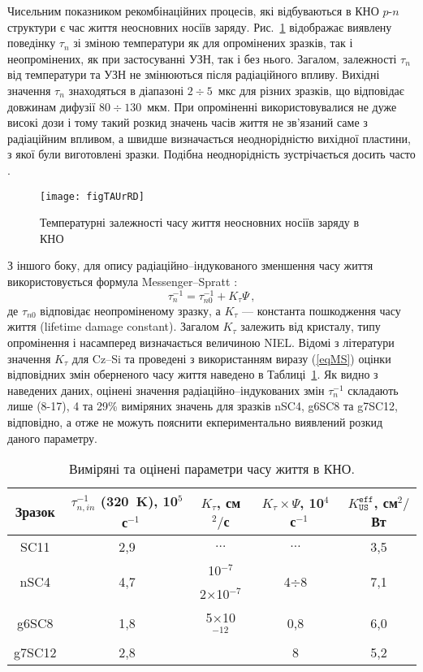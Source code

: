 Чисельним показником рекомбінаційних процесів, які відбуваються в КНО $p$-$n$ структури є
час життя неосновних носіїв заряду.
Рис.~\ref{figTAUrRD} відображає виявлену поведінку $\tau_n$ зі зміною температури як для опромінених зразків,
так і неопромінених, як при застосуванні УЗН, так і без нього.
Загалом, залежності $\tau_n$ від температури та УЗН не змінюються після радіаційного впливу.
Вихідні значення $\tau_n$ знаходяться в діапазоні $2\div5$~мкс для різних зразків,
що відповідає довжинам дифузії $80\div130$~мкм.
При опроміненні використовувалися не дуже високі дози і тому
такий розкид значень часів життя не зв'язаний саме з радіаційним впливом,
а швидше визначається неоднорідністю вихідної пластини, з якої були виготовлені зразки.
Подібна неоднорідність зустрічається досить часто \cite{Oxide:Chen,Oxide_Schon}.


\begin{figure}
\center
\texttt{[image: figTAUrRD]}
\caption{\label{figTAUrRD}
Температурні залежності часу життя неосновних носіїв заряду в КНО
\FigCaptionSSCRD
}%
\end{figure}

З іншого боку, для опису радіаційно--індукованого зменшення часу життя використовується формула Messenger--Spratt \cite{Markvart}:
\begin{equation}
\label{eqMS}
\tau_n^{-1}=\tau_{n0}^{-1}+K_\tau\Psi\,,
\end{equation}
де
$\tau_{n0}$ відповідає неопроміненому зразку, а
$K_\tau$ --- константа пошкодження часу життя (lifetime damage constant).
Загалом $K_\tau$ залежить від кристалу, типу опромінення і насамперед визначається величиною NIEL.
Відомі з літератури значення $K_\tau$ для Cz--Si та проведені з використанням виразу (\ref{eqMS}) оцінки відповідних
змін оберненого часу життя наведено в Таблиці~\ref{tabTAUn}.
Як видно з наведених даних, оцінені значення радіаційно--індукованих змін $\tau_n^{-1}$ складають лише
(8-17), 4 та 29\% виміряних значень для зразків nSC4, g6SC8 та g7SC12, відповідно, а отже не можуть
пояснити екпериментально виявлений розкид даного параметру.

\begin{table}
\caption{\label{tabTAUn}Виміряні та оцінені параметри часу життя в КНО.
}
\center
\begin{tabular}{|c|c|c|c|c|}
\hline
Зразок &$\tau_{n,in}^{-1}$ (320~K), 10$^5$~с$^{-1}$&$K_\tau$, см$^2/$с&$K_\tau\times\Psi$, 10$^4$~с$^{-1}$&$K_\mathtt{US}^\mathtt{eff}$, см$^2/$Вт\\ \hline
SC11&2,9&$\ldots$&$\ldots$&3,5\\ \hline
\multirow{2}{*}{nSC4}&\multirow{2}{*}{4,7}&10$^{-7}$ \cite{NIEL:Jafari}&\multirow{2}{*}{4$\div$8}&\multirow{2}{*}{7,1}\\ %
&&2$\times$10$^{-7}$ \cite{n:Gaubas}&&\\ \hline
g6SC8&1,8&5$\times$10$^{-12}$&0,8&6,0\\ \cline{1-2} \cline{4-5}%
g7SC12&2,8& \cite{NIEL:Jafari,gamma:Kolkov} &8&5,2\\ \hline
\end{tabular}
\end{table}

